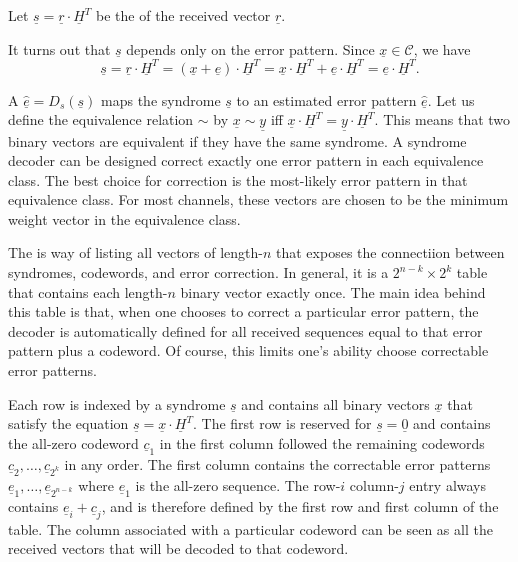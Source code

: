 \begin{definition}
Let $\underline{s}=\underline{r}\cdot\underline{H}^{T}$ be the  of the received vector $\underline{r}$.
\end{definition}
It turns out that $\underline{s}$ depends only on the error pattern.
Since $\underline{x}\in\mathcal{C}$, we have
\[ \underline{s}=\underline{r}\cdot\underline{H}^{T}=(\underline{x}+\underline{e})\cdot\underline{H}^{T}=\underline{x}\cdot\underline{H}^{T}+\underline{e}\cdot\underline{H}^{T}=\underline{e}\cdot\underline{H}^{T}. \]

A  $\underline{\hat{e}}=D_{s}(\underline{s})$ maps the syndrome $\underline{s}$ to an estimated error pattern $\underline{\hat{e}}$.
Let us define the equivalence relation $\sim$ by $\underline{x}\sim\underline{y}$ iff $\underline{x}\cdot\underline{H}^{T}=\underline{y}\cdot\underline{H}^{T}$.
This means that two binary vectors are equivalent if they have the same syndrome.
A syndrome decoder can be designed correct exactly one error pattern in each equivalence class.
The best choice for correction is the most-likely error pattern in that equivalence class.
For most channels, these vectors are chosen to be the minimum weight vector in the equivalence class.

The  is way of listing all vectors of length-$n$ that exposes the connectiion between syndromes, codewords, and error correction.
In general, it is a $2^{n-k}\times 2^k$ table that contains each length-$n$ binary vector exactly once.
The main idea behind this table is that, when one chooses to correct a particular error pattern, the decoder is automatically defined for all received sequences equal to that error pattern plus a codeword.
Of course, this limits one's ability choose correctable error patterns.


Each row is indexed by a syndrome $\underline{s}$ and contains all binary vectors $\underline{x}$ that satisfy the equation $\underline{s}=\underline{x}\cdot\underline{H}^{T}$.
The first row is reserved for $\underline{s}=\underline{0}$ and contains the all-zero codeword $\underline{c}_1$ in the first column followed the remaining codewords $\underline{c}_2,\ldots,\underline{c}_{2^k}$ in any order.
The first column contains the correctable error patterns $\underline{e}_1 ,\ldots, \underline{e}_{2^{n-k}}$ where $\underline{e}_1$ is the all-zero sequence.
The row-$i$ column-$j$ entry always contains $\underline{e}_i + \underline{c}_j$, and is therefore defined by the first row and first column of the table.
The column associated with a particular codeword can be seen as all the received vectors that will be decoded to that codeword.


